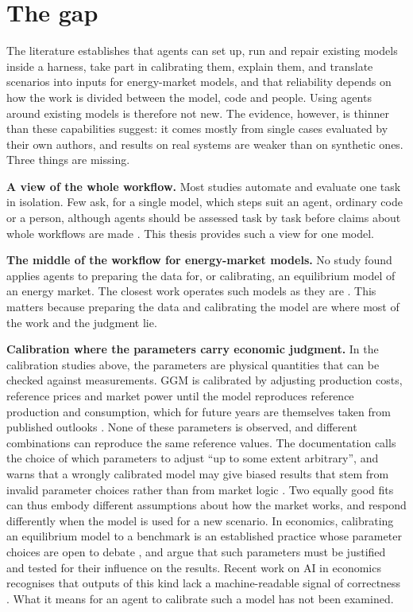 \section{The gap}

The literature establishes that agents can set up, run and repair existing models inside a harness, take part in calibrating them, explain them, and translate scenarios into inputs for energy-market models, and that reliability depends on how the work is divided between the model, code and people.
Using agents around existing models is therefore not new.
The evidence, however, is thinner than these capabilities suggest: it comes mostly from single cases evaluated by their own authors, and results on real systems are weaker than on synthetic ones.
Three things are missing.

\textbf{A view of the whole workflow.} Most studies automate and evaluate one task in isolation.
Few ask, for a single model, which steps suit an agent, ordinary code or a person, although agents should be assessed task by task before claims about whole workflows are made \citep{chen2025scienceagentbench}.
This thesis provides such a view for one model.

\textbf{The middle of the workflow for energy-market models.} No study found applies agents to preparing the data for, or calibrating, an equilibrium model of an energy market.
The closest work operates such models as they are \citep{golden2026agentic}.
This matters because preparing the data and calibrating the model are where most of the work and the judgment lie.

\textbf{Calibration where the parameters carry economic judgment.} In the calibration studies above, the parameters are physical quantities that can be checked against measurements.
GGM is calibrated by adjusting production costs, reference prices and market power until the model reproduces reference production and consumption, which for future years are themselves taken from published outlooks \citep[p.~26]{egging2019global}.
None of these parameters is observed, and different combinations can reproduce the same reference values.
The documentation calls the choice of which parameters to adjust ``up to some extent arbitrary'', and warns that a wrongly calibrated model may give biased results that stem from invalid parameter choices rather than from market logic \citep[p.~26]{egging2019global}.
Two equally good fits can thus embody different assumptions about how the market works, and respond differently when the model is used for a new scenario.
In economics, calibrating an equilibrium model to a benchmark is an established practice whose parameter choices are open to debate \citep{dawkins2001calibration}, and \citet{hansen1996empirical} argue that such parameters must be justified and tested for their influence on the results.
Recent work on AI in economics recognises that outputs of this kind lack a machine-readable signal of correctness \citep{zhu2026pai}.
What it means for an agent to calibrate such a model has not been examined.

